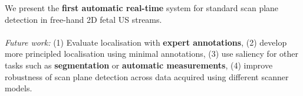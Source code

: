 \documentclass[a0paper,portrait]{baposter}
\begin{document}
\begin{poster}
{\begin{multicols}{2}
We present the {\bf first automatic real-time} system for standard scan plane 
detection in free-hand 2D fetal US streams.\\\vspace{-10pt}\\
\emph{Future work:} (1) Evaluate localisation with {\bf expert annotations}, 
(2) develop more principled localisation using minimal annotations, (3) use saliency 
for other tasks such as {\bf segmentation} or {\bf automatic measurements}, 
(4) improve robustness of scan plane detection across data acquired using 
different scanner models. 
\end{multicols} 

}


\end{poster}
\end{document}
